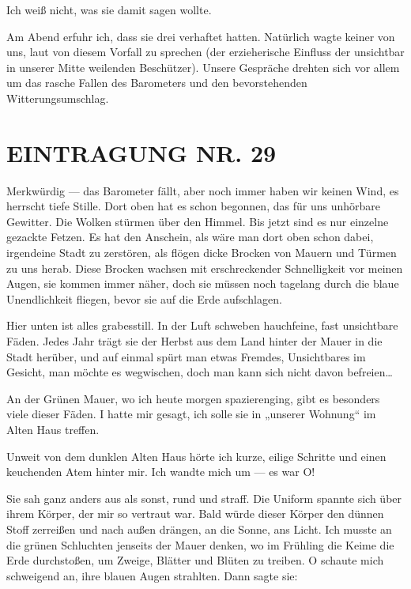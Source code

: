 Ich weiß nicht, was sie damit sagen wollte.

Am Abend erfuhr ich, dass sie drei verhaftet hatten.
Natürlich wagte keiner von uns, laut von diesem Vorfall zu sprechen
(der erzieherische Einfluss der unsichtbar in unserer Mitte
weilenden Beschützer). Unsere Gespräche drehten sich vor allem um
das rasche Fallen des Barometers und den bevorstehenden
Witterungsumschlag.

\section{EINTRAGUNG NR. 29}

Merkwürdig — das Barometer fällt, aber noch immer haben wir keinen
Wind, es herrscht tiefe Stille. Dort oben hat es schon begonnen,
das für uns unhörbare Gewitter. Die Wolken stürmen über den Himmel.
Bis jetzt sind es nur einzelne gezackte Fetzen. Es hat den
Anschein, als wäre man dort oben schon dabei, irgendeine Stadt zu
zerstören, als flögen dicke Brocken von Mauern und Türmen zu uns
herab. Diese Brocken wachsen mit erschreckender Schnelligkeit vor
meinen Augen, sie kommen immer näher, doch sie müssen noch tagelang
durch die blaue Unendlichkeit fliegen, bevor sie auf die Erde
aufschlagen.

Hier unten ist alles grabesstill. In der Luft schweben hauchfeine,
fast unsichtbare Fäden. Jedes Jahr trägt sie der Herbst aus dem
Land hinter der Mauer in die Stadt herüber, und auf einmal spürt
man etwas Fremdes, Unsichtbares im Gesicht, man möchte es
wegwischen, doch man kann sich nicht davon befreien\ldots{}

An der
Grünen Mauer, wo ich heute morgen spazierenging, gibt es besonders
viele dieser Fäden. I hatte mir gesagt, ich solle sie in „unserer
Wohnung“ im Alten Haus treffen.

Unweit von dem dunklen Alten Haus hörte ich kurze, eilige Schritte
und einen keuchenden Atem hinter mir. Ich wandte mich um — es war
O!

Sie sah ganz anders aus als sonst, rund und straff. Die Uniform
spannte sich über ihrem Körper, der mir so vertraut war. Bald würde
dieser Körper den dünnen Stoff zerreißen und nach außen drängen, an
die Sonne, ans Licht. Ich musste an die grünen Schluchten jenseits
der Mauer denken, wo im Frühling die Keime die Erde durchstoßen, um
Zweige, Blätter und Blüten zu treiben. O schaute mich schweigend
an, ihre blauen Augen strahlten. Dann sagte sie:

